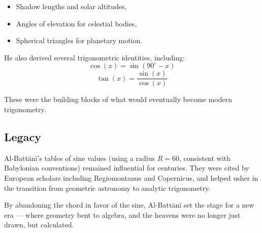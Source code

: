 \begin{itemize}
    \item Shadow lengths and solar altitudes,
    \item Angles of elevation for celestial bodies,
    \item Spherical triangles for planetary motion.
\end{itemize}

He also derived several trigonometric identities, including:
\[
\cos(x) = \sin(90^\circ - x)
\]
\[
\tan(x) = \frac{\sin(x)}{\cos(x)}
\]

These were the building blocks of what would eventually become modern trigonometry.

\subsection{Legacy}

Al-Battānī's tables of sine values (using a radius \( R = 60 \), consistent with Babylonian conventions) remained influential for centuries. They were cited by European scholars including Regiomontanus and Copernicus, and helped usher in the transition from geometric astronomy to analytic trigonometry.

By abandoning the chord in favor of the sine, Al-Battānī set the stage for a new era — where geometry bent to algebra, and the heavens were no longer just drawn, but calculated.
